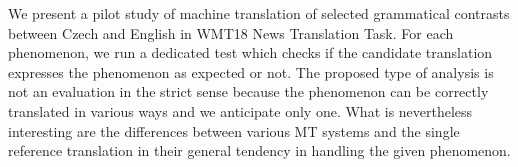 We present a pilot study of machine translation of selected grammatical contrasts between Czech and English in WMT18 News Translation Task. For each phenomenon, we run a dedicated test which checks if the candidate translation expresses the phenomenon as expected or not. The proposed type of analysis is not an evaluation in the strict sense because the phenomenon can be correctly translated in various ways and we anticipate only one. What is nevertheless interesting are the differences between various MT systems and the single reference translation in their general tendency in handling the given phenomenon.
